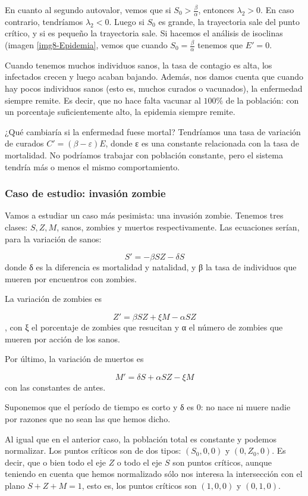 En cuanto al segundo autovalor, vemos que si $S_0 > \frac{β}{α}$, entonces $λ_2 > 0$. En caso contrario, tendríamos $λ_2 < 0$. Luego si $S_0$ es grande, la trayectoria sale del punto crítico, y si es pequeño la trayectoria sale. Si hacemos el análisis de isoclinas (imagen \ref{img8-Epidemia}, vemos que cuando $S_0 = \frac{β}{α}$ tenemos que $E' = 0$.

Cuando tenemos muchos individuos sanos, la tasa de contagio es alta, los infectados crecen y luego acaban bajando. Además, nos damos cuenta que cuando hay pocos individuos sanos (esto es, muchos curados o vacunados), la enfermedad siempre remite. Es decir, que no hace falta vacunar al $100\%$ de la población: con un porcentaje suficientemente alto, la epidemia siempre remite.

¿Qué cambiaría si la enfermedad fuese mortal? Tendríamos una tasa de variación de curados $C' = (β-ε) E$, donde ε es una constante relacionada con la tasa de mortalidad. No podríamos trabajar con población constante, pero el sistema tendría más o menos el mismo comportamiento.

\subsubsection{Caso de estudio: invasión zombie}

Vamos a estudiar un caso más pesimista: una invasión zombie. Tenemos tres clases: $S, Z, M$, sanos, zombies y muertos respectivamente. Las ecuaciones serían, para la variación de sanos:

\[ S' = -βSZ - δS \] donde δ es la diferencia es mortalidad y natalidad, y β la tasa de individuos que mueren por encuentros con zombies. 

La variación de zombies es

\[ Z' = βSZ + ξM - αSZ \], con ξ el porcentaje de zombies que resucitan y α el número de zombies que mueren por acción de los sanos. 

Por último, la variación de muertos es

\[ M' = δS + αSZ - ξM \] con las constantes de antes.

Suponemos que el período de tiempo es corto y δ es $0$: no nace ni muere nadie por razones que no sean las que hemos dicho. 

Al igual que en el anterior caso, la población total es constante y podemos normalizar. Los puntos críticos son de dos tipos: $(S_0, 0,0)$ y $(0,Z_0, 0)$. Es decir, que o bien todo el eje $Z$ o todo el eje $S$ son puntos críticos, aunque teniendo en cuenta que hemos normalizado sólo nos interesa la intersección con el plano $S+Z+M = 1$, esto es, los puntos críticos son $(1,0,0)$ y $(0,1,0)$.

